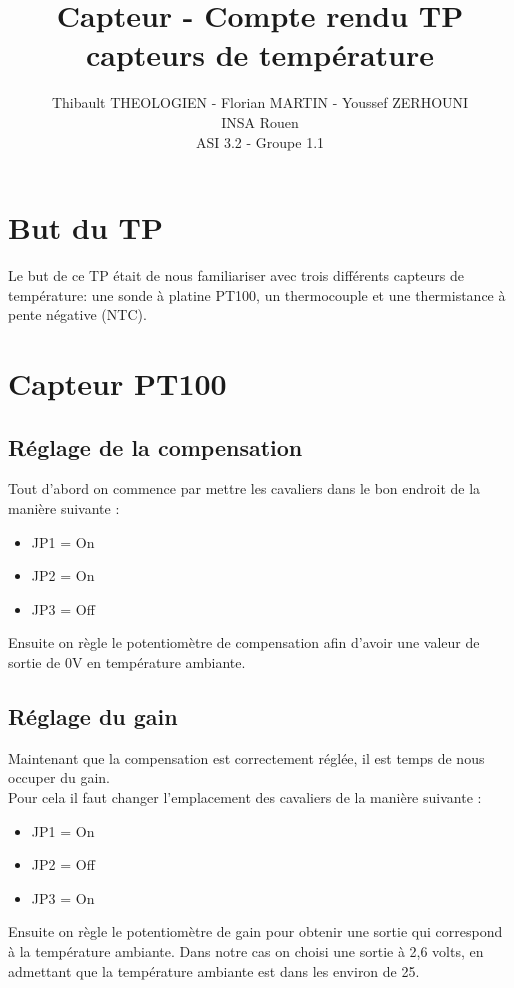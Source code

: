 \documentclass[a4paper,12pt]{article}
\title{Capteur - Compte rendu TP capteurs de température}
\author{
	Thibault THEOLOGIEN - Florian MARTIN - Youssef ZERHOUNI\\
	INSA Rouen\\
	ASI 3.2 - Groupe 1.1
}
\begin{document}
	\maketitle
	\tableofcontents
	\newpage

	\section{But du TP}
	\label{sec:But du TP}
		\par Le but de ce TP était de nous familiariser avec trois différents capteurs de température: une sonde à platine PT100, un thermocouple et une thermistance à pente négative (NTC).

  \section{Capteur PT100}

    \subsection{Réglage de la compensation}
      \par Tout d'abord on commence par mettre les cavaliers dans le bon endroit de la manière suivante :
      \begin{itemize}
        \item JP1 = On
        \item JP2 = On
        \item JP3 = Off
      \end{itemize}
      Ensuite on règle le potentiomètre de compensation afin d'avoir une valeur de sortie de 0V en température ambiante.

    \subsection{Réglage du gain}
      \par Maintenant que la compensation est correctement réglée, il est temps de nous occuper du gain.\\
      Pour cela il faut changer l'emplacement des cavaliers de la manière suivante :
      \begin{itemize}
        \item JP1 = On
        \item JP2 = Off
        \item JP3 = On
      \end{itemize}
      Ensuite on règle le potentiomètre de gain pour obtenir une sortie qui correspond à la température ambiante.
      Dans notre cas on choisi une sortie à 2,6 volts, en admettant que la température ambiante est dans les environ de 25\degre.
\end{document}
